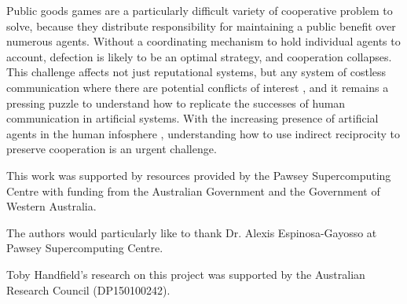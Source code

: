 \documentclass[sigconf]{aamas}  %
\begin{document}
Public goods games are a particularly difficult variety of cooperative problem to solve, because they distribute responsibility for maintaining a public benefit over numerous agents. Without a coordinating mechanism to hold individual agents to account, defection is likely to be an optimal strategy, and cooperation collapses. This challenge affects not just reputational systems, but any system of costless communication where there are potential conflicts of interest \cite{lachmann_disadvantage_2004}, and it remains a pressing puzzle to understand how to replicate the successes of human communication in artificial systems. With the increasing presence of artificial agents in the human infosphere \cite{varol_online_2017}, understanding how to use indirect reciprocity to preserve cooperation is an urgent challenge.

\begin{acks}
This work was supported by resources provided by the Pawsey Supercomputing Centre with funding from the Australian Government and the Government of Western Australia.

The authors would particularly like to thank Dr. Alexis Espinosa-Gayosso at Pawsey Supercomputing Centre.

Toby Handfield's research on this project was supported by the Australian Research Council (DP150100242).
\end{acks}


\balance  %
\end{document}
